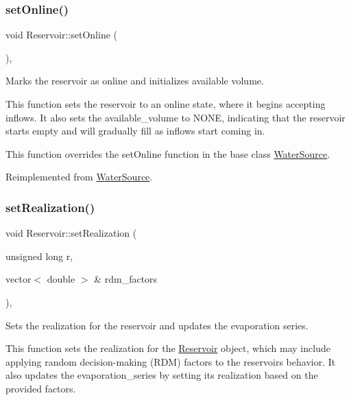 \subsubsection{\texorpdfstring{set\+Online()}{setOnline()}}
{\footnotesize\ttfamily void Reservoir\+::set\+Online (\begin{DoxyParamCaption}{ }\end{DoxyParamCaption})\hspace{0.3cm}{\ttfamily [override]}, {\ttfamily [virtual]}}



Marks the reservoir as online and initializes available volume. 

This function sets the reservoir to an online state, where it begins accepting inflows. It also sets the {\ttfamily available\+\_\+volume} to {\ttfamily N\+O\+NE}, indicating that the reservoir starts empty and will gradually fill as inflows start coming in.

This function overrides the {\ttfamily set\+Online} function in the base class {\ttfamily \mbox{\hyperlink{classWaterSource}{Water\+Source}}}. 

Reimplemented from \mbox{\hyperlink{classWaterSource_aaa55dc6e14ff184380300147b53c56ec}{Water\+Source}}.

\mbox{\label{classReservoir_ad1bb7aa46397719d09e0b6188b9bc28d}} 
\subsubsection{\texorpdfstring{set\+Realization()}{setRealization()}}
{\footnotesize\ttfamily void Reservoir\+::set\+Realization (\begin{DoxyParamCaption}\item[{unsigned long}]{r,  }\item[{vector$<$ double $>$ \&}]{rdm\+\_\+factors }\end{DoxyParamCaption})\hspace{0.3cm}{\ttfamily [override]}, {\ttfamily [virtual]}}



Sets the realization for the reservoir and updates the evaporation series. 

This function sets the realization for the {\ttfamily \mbox{\hyperlink{classReservoir}{Reservoir}}} object, which may include applying random decision-\/making (R\+DM) factors to the reservoir\textquotesingle{}s behavior. It also updates the {\ttfamily evaporation\+\_\+series} by setting its realization based on the provided factors.

